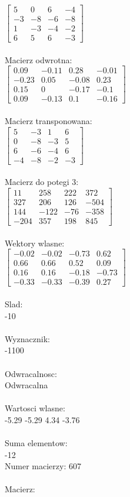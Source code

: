 \documentclass[a4paper,12pt]{article}
\begin{document}
$\begin{bmatrix} 5&0&6&-4\\-3&-8&-6&-8\\1&-3&-4&-2\\6&5&6&-3 \end{bmatrix}$
\\
\\
Macierz odwrotna:\\

$\begin{bmatrix} 0.09&-0.11&0.28&-0.01\\-0.23&0.05&-0.08&0.23\\0.15&0&-0.17&-0.1\\0.09&-0.13&0.1&-0.16 \end{bmatrix}$
\\
\\
Macierz transponowana:\\

$\begin{bmatrix} 5&-3&1&6\\0&-8&-3&5\\6&-6&-4&6\\-4&-8&-2&-3 \end{bmatrix}$
\\
\\
Macierz do potegi 3:\\

$\begin{bmatrix} 11&258&222&372\\327&206&126&-504\\144&-122&-76&-358\\-204&357&198&845 \end{bmatrix}$
\\
\\
Wektory wlasne:\\

$\begin{bmatrix} -0.02&-0.02&-0.73&0.62\\0.66&0.66&0.52&0.09\\0.16&0.16&-0.18&-0.73\\-0.33&-0.33&-0.39&0.27 \end{bmatrix}$
\\
\\
Slad:\\
-10
\\
\\
Wyznacznik:\\
-1100
\\
\\
Odwracalnosc:\\
Odwracalna
\\
\\
Wartosci wlasne:\\
-5.29 -5.29 4.34 -3.76
\\
\\
Suma elementow:\\
-12
\\
\newpage
Numer macierzy:
607
\\
\\
Macierz:\\
\end{document}
